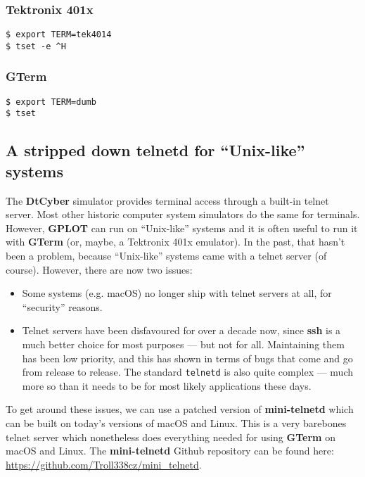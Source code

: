 \documentclass[a4paper,twoside,11pt]{article}
\newcommand{\newpara}{\par\vspace{4mm}\noindent}
\begin{document}
\subsubsection{Tektronix 401x}
\begin{lstlisting}
$ export TERM=tek4014
$ tset -e ^H
\end{lstlisting}

\subsubsection{GTerm}
\begin{lstlisting}
$ export TERM=dumb
$ tset
\end{lstlisting}

\subsection{A stripped down telnetd for ``Unix-like'' systems}
\newpara
The \textbf{DtCyber} simulator provides terminal access through a built-in telnet server. Most other historic computer system simulators
do the same for terminals. However, \textbf{GPLOT} can run on ``Unix-like'' systems and it is often useful to run it with
\textbf{GTerm} (or, maybe, a Tektronix 401x emulator). In the past, that hasn't been a problem, because ``Unix-like'' systems
came with a telnet server (of course). However, there are now two issues:
\begin{itemize}
\item Some systems (e.g. macOS) no longer ship with telnet servers at all, for ``security'' reasons.
\item Telnet servers have been disfavoured for over a decade now, since \textbf{ssh} is a much better choice for most purposes --- but
  not for all. Maintaining them has been low priority, and this has shown in terms of bugs that come and go from release to
  release. The standard \texttt{telnetd} is also quite complex --- much more so than it needs to be for most likely applications
  these days.
\end{itemize}

\newpara
To get around these issues, we can use a patched version
of \textbf{mini-telnetd} which can be built on today's versions of macOS and Linux.
This is a very barebones telnet server which nonetheless does everything needed for using \textbf{GTerm} on macOS and Linux.
The \textbf{mini-telnetd} Github repository can be found here: \url{https://github.com/Troll338cz/mini_telnetd}.
\end{document}
